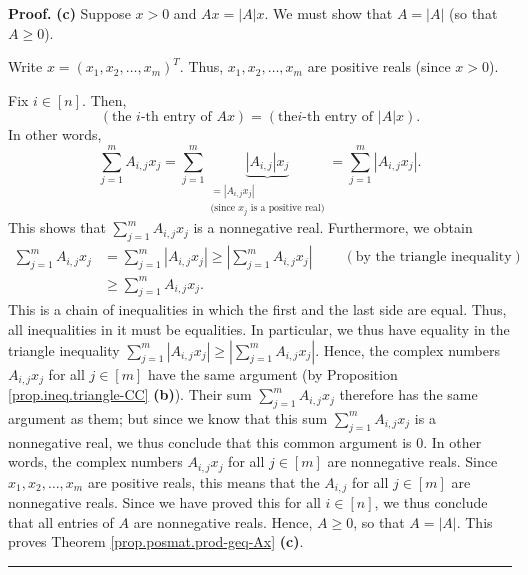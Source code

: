 \documentclass[numbers=enddot,12pt,final,onecolumn,notitlepage]{scrartcl}%
\numberwithin{exer}{subsection}
\theoremstyle{definition}
\newenvironment{proof}[1][Proof]{\noindent\textbf{#1.} }{\ \rule{0.5em}{0.5em}}
\let\sumnonlimits\sum
\renewcommand{\sum}{\sumnonlimits\limits}
\begin{document}
\begin{proof}
\textbf{(c)} Suppose $x>0$ and $Ax=\left\vert A\right\vert x$. We must show
that $A=\left\vert A\right\vert $ (so that $A\geq0$).

Write $x=\left(  x_{1},x_{2},\ldots,x_{m}\right)  ^{T}$. Thus, $x_{1}%
,x_{2},\ldots,x_{m}$ are positive reals (since $x>0$).

Fix $i\in\left[  n\right]  $. Then,%
\[
\left(  \text{the }i\text{-th entry of }Ax\right)  =\left(  \text{the
}i\text{-th entry of }\left\vert A\right\vert x\right)  .
\]
In other words,%
\[
\sum_{j=1}^{m}A_{i,j}x_{j}=\sum_{j=1}^{m}\underbrace{\left\vert A_{i,j}%
\right\vert x_{j}}_{\substack{=\left\vert A_{i,j}x_{j}\right\vert
\\\text{(since }x_{j}\text{ is a positive real)}}}=\sum_{j=1}^{m}\left\vert
A_{i,j}x_{j}\right\vert .
\]
This shows that $\sum_{j=1}^{m}A_{i,j}x_{j}$ is a nonnegative real.
Furthermore, we obtain
\begin{align*}
\sum_{j=1}^{m}A_{i,j}x_{j}  &  =\sum_{j=1}^{m}\left\vert A_{i,j}%
x_{j}\right\vert \geq\left\vert \sum_{j=1}^{m}A_{i,j}x_{j}\right\vert
\ \ \ \ \ \ \ \ \ \ \left(  \text{by the triangle inequality}\right) \\
&  \geq\sum_{j=1}^{m}A_{i,j}x_{j}.
\end{align*}
This is a chain of inequalities in which the first and the last side are
equal. Thus, all inequalities in it must be equalities. In particular, we thus
have equality in the triangle inequality $\sum_{j=1}^{m}\left\vert
A_{i,j}x_{j}\right\vert \geq\left\vert \sum_{j=1}^{m}A_{i,j}x_{j}\right\vert
$. Hence, the complex numbers $A_{i,j}x_{j}$ for all $j\in\left[  m\right]  $
have the same argument (by Proposition \ref{prop.ineq.triangle-CC}
\textbf{(b)}). Their sum $\sum_{j=1}^{m}A_{i,j}x_{j}$ therefore has the same
argument as them; but since we know that this sum $\sum_{j=1}^{m}A_{i,j}x_{j}$
is a nonnegative real, we thus conclude that this common argument is $0$. In
other words, the complex numbers $A_{i,j}x_{j}$ for all $j\in\left[  m\right]
$ are nonnegative reals. Since $x_{1},x_{2},\ldots,x_{m}$ are positive reals,
this means that the $A_{i,j}$ for all $j\in\left[  m\right]  $ are nonnegative
reals. Since we have proved this for all $i\in\left[  n\right]  $, we thus
conclude that all entries of $A$ are nonnegative reals. Hence, $A\geq0$, so
that $A=\left\vert A\right\vert $. This proves Theorem
\ref{prop.posmat.prod-geq-Ax} \textbf{(c)}.
\end{proof}
\end{document}
